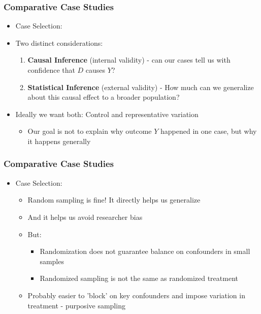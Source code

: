\documentclass[xcolor=x11names,compress]{beamer}\usepackage[]{graphicx}\usepackage[]{color}
\renewcommand{\(}{\begin{columns}}
\renewcommand{\)}{\end{columns}}
\newcommand{\<}[1]{\begin{column}{#1}}
\renewcommand{\>}{\end{column}}
\begin{document}
\begin{frame}
\frametitle{Comparative Case Studies}
\begin{itemize}
\item Case Selection:
\pause
\item Two distinct considerations:
\pause
\begin{enumerate}
\item \textbf{Causal Inference} (internal validity) - can our cases tell us with confidence that $D$ causes $Y$?
\pause
\item \textbf{Statistical Inference} (external validity) - How much can we generalize about this causal effect to a broader population?
\pause
\end{enumerate}
\item Ideally we want both: Control and representative variation
\pause
\begin{itemize}
\item Our goal is not to explain why outcome $Y$ happened in one case, but why it happens generally
\end{itemize}
\end{itemize}
\end{frame}

\begin{frame}
\frametitle{Comparative Case Studies}
\begin{itemize}
\item Case Selection:
\pause
\begin{itemize}
\item Random sampling is fine! It directly helps us generalize
\pause
\item And it helps us avoid researcher bias
\pause
\item But:
\pause
\begin{itemize}
\item Randomization does not guarantee balance on confounders in small samples
\pause
\item Randomized sampling is not the same as randomized treatment
\end{itemize}
\item Probably easier to 'block' on key confounders and impose variation in treatment - purposive sampling
\end{itemize}
\end{itemize}
\end{frame}
\end{document}
